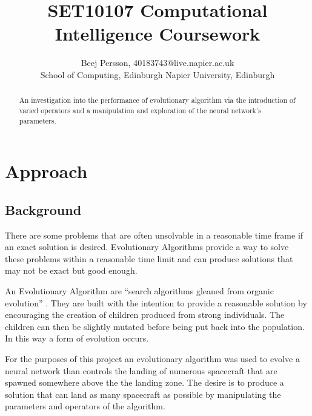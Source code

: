 \documentclass[sigconf]{acmart}
\begin{document}
\title{SET10107 Computational Intelligence Coursework}

\author{Beej Persson, 40183743@live.napier.ac.uk\\School of Computing, Edinburgh Napier University, Edinburgh}



\begin{abstract}
An investigation into the performance of evolutionary algorithm via the introduction of varied operators and a manipulation and exploration of the neural network's parameters.
\end{abstract}





\maketitle

\section{Approach}

\subsection{Background}
There are some problems that are often unsolvable in a reasonable time frame if an exact solution is desired. Evolutionary Algorithms provide a way to solve these problems within a reasonable time limit and can produce solutions that may not be exact but good enough. 

An Evolutionary Algorithm are ``search algorithms gleaned from organic evolution'' \cite{back96}. They are built with the intention to provide a reasonable solution by encouraging the creation of children produced from strong individuals. The children can then be slightly mutated before being put back into the population. In this way a form of evolution occurs.

For the purposes of this project an evolutionary algorithm was used to evolve a neural network than controls the landing of numerous spacecraft that are spawned somewhere above the the landing zone. The desire is to produce a solution that can land as many spacecraft as possible by manipulating the parameters and operators of the algorithm.
\end{document}
